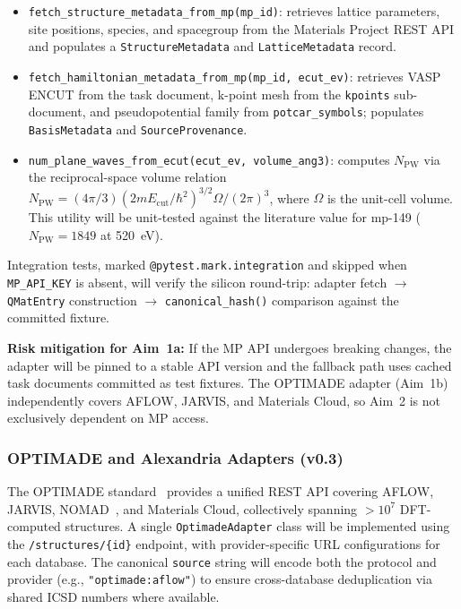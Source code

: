\documentclass[11pt]{article}
\newcommand{\Ecut}{E_{\mathrm{cut}}{}}
\newcommand{\NPW}{N_{\mathrm{PW}}}
\begin{document}
\begin{itemize}[leftmargin=1.5em, itemsep=1pt]
  \item \texttt{fetch\_structure\_metadata\_from\_mp(mp\_id)}: retrieves
    lattice parameters, site positions, species, and spacegroup from the
    Materials Project REST API and populates a \texttt{StructureMetadata}
    and \texttt{LatticeMetadata} record.
  \item \texttt{fetch\_hamiltonian\_metadata\_from\_mp(mp\_id, ecut\_ev)}:
    retrieves VASP ENCUT from the task document, k-point mesh from the
    \texttt{kpoints} sub-document, and pseudopotential family from
    \texttt{potcar\_symbols}; populates \texttt{BasisMetadata} and
    \texttt{SourceProvenance}.
  \item \texttt{num\_plane\_waves\_from\_ecut(ecut\_ev, volume\_ang3)}:
    computes $\NPW$ via the reciprocal-space volume relation
    $\NPW = (4\pi/3)(2m\Ecut/\hbar^2)^{3/2} \Omega / (2\pi)^3$,
    where $\Omega$ is the unit-cell volume. This utility will be
    unit-tested against the literature value for mp-149
    ($\NPW = 1849$ at 520~eV).
\end{itemize}

Integration tests, marked \texttt{@pytest.mark.integration} and skipped
when \texttt{MP\_API\_KEY} is absent, will verify the silicon round-trip:
adapter fetch $\rightarrow$ \texttt{QMatEntry} construction $\rightarrow$
\texttt{canonical\_hash()} comparison against the committed fixture.

\textbf{Risk mitigation for Aim~1a:} If the MP API undergoes breaking
changes, the adapter will be pinned to a stable API version and the
fallback path uses cached task documents committed as test fixtures.
The OPTIMADE adapter (Aim~1b) independently covers AFLOW, JARVIS, and
Materials Cloud, so Aim~2 is not exclusively dependent on MP access.

\subsubsection{OPTIMADE and Alexandria Adapters (v0.3)}

The OPTIMADE standard~\cite{Andersen2021} provides a unified REST API
covering AFLOW, JARVIS, NOMAD~\cite{Draxl2019}, and Materials Cloud,
collectively spanning $> 10^7$ DFT-computed structures.
A single \texttt{OptimadeAdapter} class will be implemented using the
\texttt{/structures/\{id\}} endpoint, with provider-specific URL
configurations for each database.
The canonical \texttt{source} string will encode both the protocol and
provider (e.g., \texttt{"optimade:aflow"}) to ensure cross-database
deduplication via shared ICSD numbers where available.
\end{document}
